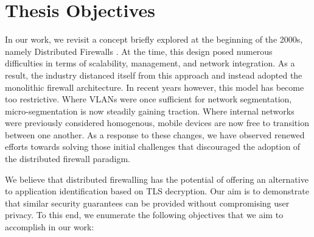 \section{Thesis Objectives}
\label{intro:objectives}

In our work, we revisit a concept briefly explored at the beginning of the 2000s,
namely Distributed Firewalls \cite{ioannidis2000implementing}. At the time, this
design posed numerous difficulties in terms of scalability, management, and
network integration. As a result, the industry distanced itself from this
approach and instead adopted the monolithic firewall architecture. In recent
years however, this model has become too restrictive. Where VLANs were once
sufficient for network segmentation, micro-segmentation is now steadily gaining
traction. Where internal networks were previously considered homogenous, mobile
devices are now free to transition between one another. As a response to these
changes, we have observed renewed efforts \cite{bringhenti2022optimizing,
tudosi2022secure, bagheri2020dynamic} towards solving those initial challenges
that discouraged the adoption of the distributed firewall paradigm.

We believe that distributed firewalling has the potential of offering an alternative
to application identification based on TLS decryption. Our aim is to demonstrate
that similar security guarantees can be provided without compromising user
privacy. To this end, we enumerate the following objectives that we aim to
accomplish in our work:


